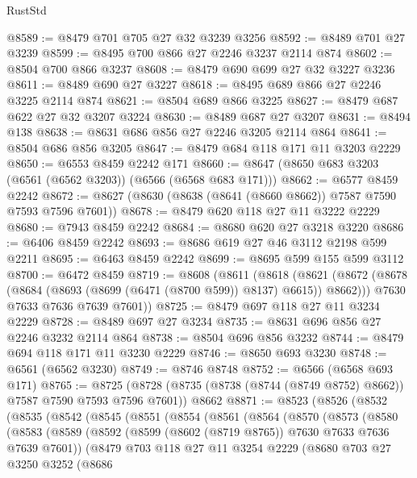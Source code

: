 \begin{lexlean}{RustStd}
\begin{coremodule}
@8589 := @8479 @701 @705 @27 @32 @3239 @3256
@8592 := @8489 @701 @27 @3239
@8599 := @8495 @700 @866 @27 @2246 @3237 @2114 @874
@8602 := @8504 @700 @866 @3237
@8608 := @8479 @690 @699 @27 @32 @3227 @3236
@8611 := @8489 @690 @27 @3227
@8618 := @8495 @689 @866 @27 @2246 @3225 @2114 @874
@8621 := @8504 @689 @866 @3225
@8627 := @8479 @687 @622 @27 @32 @3207 @3224
@8630 := @8489 @687 @27 @3207
@8631 := @8494 @138
@8638 := @8631 @686 @856 @27 @2246 @3205 @2114 @864
@8641 := @8504 @686 @856 @3205
@8647 := @8479 @684 @118 @171 @11 @3203 @2229
@8650 := @6553 @8459 @2242 @171
@8660 := @8647 (@8650 @683 @3203 (@6561 (@6562 @3203)) (@6566 (@6568 @683 @171)))
@8662 := @6577 @8459 @2242
@8672 := @8627 (@8630 (@8638 (@8641 (@8660 @8662)) @7587 @7590 @7593 @7596 @7601))
@8678 := @8479 @620 @118 @27 @11 @3222 @2229
@8680 := @7943 @8459 @2242
@8684 := @8680 @620 @27 @3218 @3220
@8686 := @6406 @8459 @2242
@8693 := @8686 @619 @27 @46 @3112 @2198 @599 @2211
@8695 := @6463 @8459 @2242
@8699 := @8695 @599 @155 @599 @3112
@8700 := @6472 @8459
@8719 := @8608
    (@8611
      (@8618
        (@8621 (@8672 (@8678 (@8684 (@8693 (@8699 (@6471 (@8700 @599)) @8137) @6615)) @8662)))
        @7630
        @7633
        @7636
        @7639
        @7601))
@8725 := @8479 @697 @118 @27 @11 @3234 @2229
@8728 := @8489 @697 @27 @3234
@8735 := @8631 @696 @856 @27 @2246 @3232 @2114 @864
@8738 := @8504 @696 @856 @3232
@8744 := @8479 @694 @118 @171 @11 @3230 @2229
@8746 := @8650 @693 @3230
@8748 := @6561 (@6562 @3230)
@8749 := @8746 @8748
@8752 := @6566 (@6568 @693 @171)
@8765 := @8725
    (@8728 (@8735 (@8738 (@8744 (@8749 @8752) @8662)) @7587 @7590 @7593 @7596 @7601))
    @8662
@8871 := @8523
    (@8526
      (@8532
        (@8535
          (@8542
            (@8545
              (@8551
                (@8554
                  (@8561
                    (@8564
                      (@8570
                        (@8573
                          (@8580
                            (@8583
                              (@8589
                                (@8592 (@8599 (@8602 (@8719 @8765)) @7630 @7633 @7636 @7639 @7601))
                                (@8479
                                  @703
                                  @118
                                  @27
                                  @11
                                  @3254
                                  @2229
                                  (@8680
                                    @703
                                    @27
                                    @3250
                                    @3252
                                    (@8686

\end{coremodule}
\end{lexlean}
